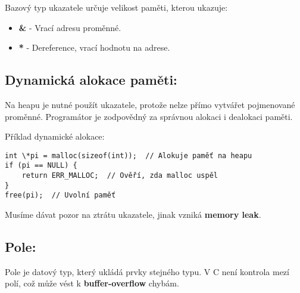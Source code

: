 \documentclass{article}
\begin{document}
Bazový typ ukazatele určuje velikost paměti, kterou ukazuje:
\begin{itemize}[noitemsep]
    \item \textbf{\&} - Vrací adresu proměnné.
    \item \textbf{*} - Dereference, vrací hodnotu na adrese.
\end{itemize}

\subsection*{Dynamická alokace paměti:}
Na heapu je nutné použít ukazatele, protože nelze přímo vytvářet pojmenované
proměnné. Programátor je zodpovědný za správnou alokaci i dealokaci paměti.

Příklad dynamické alokace:
\begin{lstlisting}
int \*pi = malloc(sizeof(int));  // Alokuje paměť na heapu
if (pi == NULL) {
    return ERR_MALLOC;  // Ověří, zda malloc uspěl
}
free(pi);  // Uvolní paměť
\end{lstlisting}

Musíme dávat pozor na ztrátu ukazatele, jinak vzniká \textbf{memory leak}.

\subsection*{Pole:}
Pole je datový typ, který ukládá prvky stejného typu. V C není kontrola mezí
polí, což může vést k \textbf{buffer-overflow} chybám.
\end{document}
